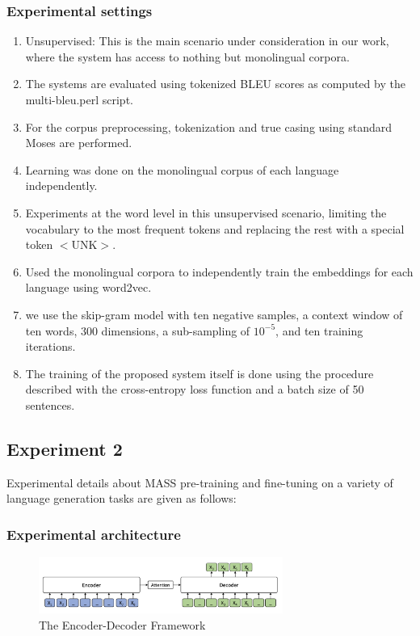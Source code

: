 \subsubsection{Experimental settings}
\begin{enumerate}
    \item Unsupervised: This is the main scenario under consideration in our work, where the system has access to nothing but monolingual corpora.
    \item The systems are evaluated using tokenized BLEU scores as computed by the multi-bleu.perl script. 
    \item For the corpus preprocessing, tokenization and true casing using standard Moses are performed.
    \item Learning was done on the monolingual corpus of each language independently. 
    \item Experiments at the word level in this unsupervised scenario, limiting the vocabulary to the most frequent tokens and replacing the rest with a special token $<$UNK$>$. 
    \item Used the monolingual corpora to independently train the embeddings for each language using word2vec.
    \item we use the skip-gram model with ten negative samples, a context window of ten words, 300 dimensions, a sub-sampling of $10^{-5}$, and ten training iterations.
    \item The training of the proposed system itself is done using the procedure described with the cross-entropy loss function and a batch size of 50 sentences.
    

\end{enumerate}


\subsection{Experiment 2}
Experimental details about MASS pre-training and fine-tuning on a variety of language generation tasks are given as follows:


\subsubsection{Experimental architecture}

 \begin{figure} [h]
    \center
    \includegraphics[width=8cm]{Figures/mass.png}  
    \caption{The Encoder-Decoder Framework}
    \label{en_dec_framework}
\end{figure}


